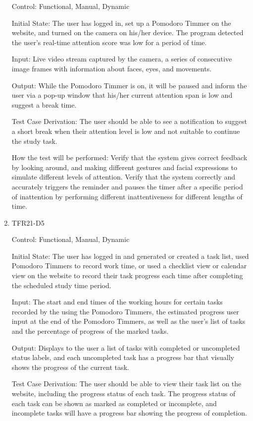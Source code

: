 \documentclass[12pt, titlepage]{article}
\begin{document}
\begin{enumerate}
Control: Functional, Manual, Dynamic
					
Initial State: The user has logged in, set up a Pomodoro Timmer on the website, and turned on the camera on his/her device. The program detected the user's real-time attention score was low for a period of time.
					
Input: Live video stream captured by the camera, a series of consecutive image frames with information about faces, eyes, and movements.
					
Output: While the Pomodoro Timmer is on, it will be paused and inform the user via a pop-up window that his/her current attention span is low and suggest a break time.

Test Case Derivation: The user should be able to see a notification to suggest a short break when their attention level is low and not suitable to continue the study task.
					
How the test will be performed: Verify that the system gives correct feedback by looking around, and making different gestures and facial expressions to simulate different levels of attention. Verify that the system correctly and accurately triggers the reminder and pauses the timer after a specific period of inattention by performing different inattentiveness for different lengths of time.

\item{TFR21-D5\\} \label{TFR21-D5}

Control: Functional, Manual, Dynamic
					
Initial State: The user has logged in and generated or created a task list, used Pomodoro Timmers to record work time, or used a checklist view or calendar view on the website to record their task progress each time after completing the scheduled study time period.
					
Input: The start and end times of the working hours for certain tasks recorded by the using the Pomodoro Timmers, the estimated progress user input at the end of the Pomodoro Timmers, as well as the user's list of tasks and the percentage of progress of the marked tasks.
					
Output: Displays to the user a list of tasks with completed or uncompleted status labels, and each uncompleted task has a progress bar that visually shows the progress of the current task.

Test Case Derivation: The user should be able to view their task list on the website, including the progress status of each task. The progress status of each task can be shown as marked as completed or incomplete, and incomplete tasks will have a progress bar showing the progress of completion.
					

\end{enumerate}
\end{document}
